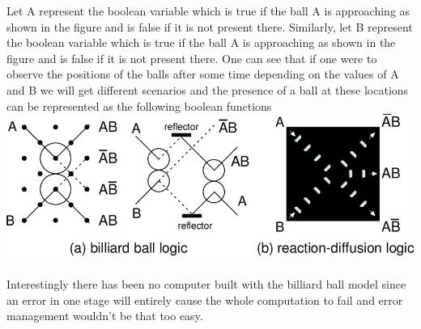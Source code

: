\documentclass{report}
\begin{document}
Let A represent the boolean variable which is true if the ball A is approaching as shown in the figure and is false if it is not present there. Similarly, let B represent the boolean variable which is true if the ball A is approaching as shown in the figure and is false if it is not present there.
One can see that if one were to observe the positions of the balls after some time depending on the values of A and B we will get different scenarios and the presence of a ball at these locations can be represented as the following boolean functions\\
\includegraphics[width = \textwidth]{images/billiard ball.jpg}\\\\
Interestingly there has been no computer built with the billiard ball model since an error in one stage will entirely cause the whole computation to fail and error management wouldn't be that too easy.
\end{document}

